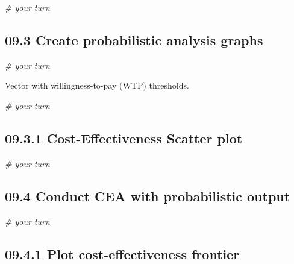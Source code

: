 \documentclass[]{article}
\newenvironment{Shaded}{\begin{snugshade}}{\end{snugshade}}
\newcommand{\CommentTok}[1]{\textcolor[rgb]{0.56,0.35,0.01}{\textit{#1}}}
\begin{document}
\begin{Shaded}
\begin{Highlighting}[]
\CommentTok{# your turn}
\end{Highlighting}
\end{Shaded}

\subsection{09.3 Create probabilistic analysis
graphs}\label{create-probabilistic-analysis-graphs}

\begin{Shaded}
\begin{Highlighting}[]
\CommentTok{# your turn}
\end{Highlighting}
\end{Shaded}

Vector with willingness-to-pay (WTP) thresholds.

\begin{Shaded}
\begin{Highlighting}[]
\CommentTok{# your turn}
\end{Highlighting}
\end{Shaded}

\subsection{09.3.1 Cost-Effectiveness Scatter
plot}\label{cost-effectiveness-scatter-plot}

\begin{Shaded}
\begin{Highlighting}[]
\CommentTok{# your turn}
\end{Highlighting}
\end{Shaded}

\subsection{09.4 Conduct CEA with probabilistic
output}\label{conduct-cea-with-probabilistic-output}

\begin{Shaded}
\begin{Highlighting}[]
\CommentTok{# your turn}
\end{Highlighting}
\end{Shaded}

\subsection{09.4.1 Plot cost-effectiveness
frontier}\label{plot-cost-effectiveness-frontier}
\end{document}
